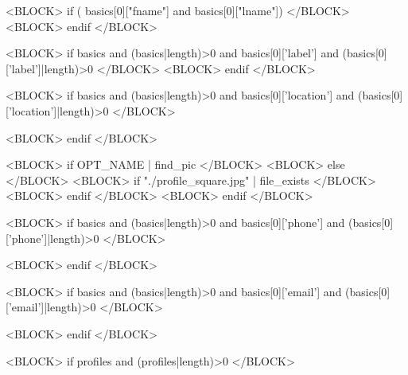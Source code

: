 



<BLOCK> if ( basics[0]["fname"] and basics[0]["lname"]) </BLOCK>
<BLOCK> endif </BLOCK>


<BLOCK> if basics and (basics|length)>0 and basics[0]['label'] and (basics[0]['label']|length)>0 </BLOCK>
<BLOCK> endif </BLOCK>

<BLOCK> if basics and (basics|length)>0 and basics[0]['location'] and (basics[0]['location']|length)>0 </BLOCK>
\address{<VAR>
  [
    basics[0]['location'][0]['city']       | default(''),
    basics[0]['location'][0]['region']     | default(''),
    basics[0]['location'][0]['postalCode'] | default(''),
    basics[0]['location'][0]['country']    | default('')
  ]
  | reject('equalto','')
  | join(', ')
  | latex_escape
</VAR>}
<BLOCK> endif </BLOCK>


<BLOCK> if OPT_NAME | find_pic </BLOCK>
<BLOCK> else </BLOCK>
  <BLOCK> if "./profile_square.jpg" | file_exists </BLOCK>
  <BLOCK> endif </BLOCK>
<BLOCK> endif </BLOCK>



<BLOCK> if basics and (basics|length)>0 and basics[0]['phone'] and (basics[0]['phone']|length)>0 </BLOCK>


<BLOCK> endif </BLOCK>

<BLOCK> if basics and (basics|length)>0 and basics[0]['email'] and (basics[0]['email']|length)>0 </BLOCK>


<BLOCK> endif </BLOCK>






<BLOCK> if profiles and (profiles|length)>0 </BLOCK>

